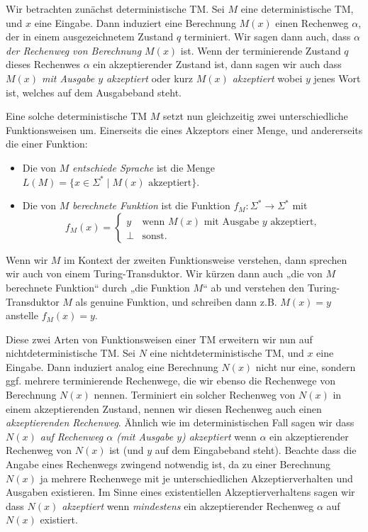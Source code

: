 Wir betrachten zunächst deterministische TM.
Sei $M$ eine deterministische TM, und $x$ eine Eingabe. Dann induziert eine Berechnung $M(x)$ einen Rechenweg $\alpha$, der in einem ausgezeichnetem Zustand $q$ terminiert. 
Wir sagen dann auch, dass \emph{$\alpha$ der Rechenweg von Berechnung $M(x)$} ist.
Wenn der terminierende Zustand $q$ dieses Rechenwes $\alpha$ ein akzeptierender Zustand ist,
dann sagen wir auch dass \emph{$M(x)$ mit Ausgabe $y$ akzeptiert} oder kurz \emph{$M(x)$ akzeptiert} wobei $y$ jenes Wort ist, welches auf dem Ausgabeband steht.

Eine solche deterministische TM $M$ setzt nun gleichzeitig zwei unterschiedliche Funktionsweisen um. Einerseits die eines Akzeptors einer Menge, und andererseits die einer Funktion:
\begin{itemize}
    \item Die von $M$ \emph{entschiede  Sprache} ist die Menge $L(M)=\{ x\in\Sigma^* \mid M(x) \text{ akzeptiert} \}$.
    \item Die von $M$ \emph{berechnete Funktion} ist die Funktion $f_M\colon\Sigma^*\to\Sigma^*$ mit
        \[ f_M(x) = \begin{cases} y & \text{wenn $M(x)$ mit Ausgabe $y$ akzeptiert,} \\ \bot & \text{sonst.} \end{cases} \] 
\end{itemize}
Wenn wir $M$ im Kontext der zweiten Funktionsweise verstehen, dann sprechen wir auch von einem Turing-Transduktor. 
Wir kürzen dann auch „die von $M$ berechnete Funktion“ durch „die Funktion $M$“ ab und verstehen den Turing-Transduktor $M$ als genuine Funktion, und schreiben dann z.B. $M(x)=y$ anstelle $f_M(x)=y$.

Diese zwei Arten von Funktionsweisen einer TM erweitern wir nun auf nichtdeterministische TM. 
Sei  $N$ eine nichtdeterministische TM, und $x$ eine Eingabe. Dann induziert analog eine Berechnung $N(x)$ nicht nur eine, sondern ggf. mehrere terminierende Rechenwege, die wir ebenso die Rechenwege von Berechnung $N(x)$ nennen. Terminiert ein solcher Rechenweg von $N(x)$ in einem akzeptierenden Zustand, nennen wir diesen Rechenweg auch einen \emph{akzeptierenden Rechenweg}.
Ähnlich wie im deterministischen Fall sagen wir dass \emph{$N(x)$ auf Rechenweg $\alpha$ (mit Ausgabe $y$) akzeptiert}  wenn $\alpha$ ein akzeptierender Rechenweg von $N(x)$ ist (und $y$ auf dem Eingabeband steht).
Beachte dass die Angabe eines Rechenwegs zwingend notwendig ist, da zu einer Berechnung $N(x)$ ja mehrere Rechenwege mit je unterschiedlichen Akzeptierverhalten und Ausgaben existieren.
Im Sinne eines existentiellen Akzeptierverhaltens sagen wir dass \emph{$N(x)$ akzeptiert} wenn \emph{mindestens} ein akzeptierender Rechenweg $\alpha$ auf $N(x)$ existiert.


